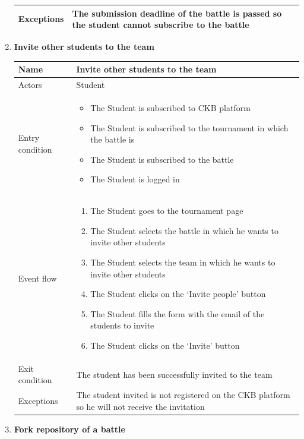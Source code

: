 \begin{enumerate}[label=UC\arabic*:]
\begin{tabular}{|p{3cm}|p{8cm}|}
        \hline
        Exceptions & The submission deadline of the battle is passed so the student cannot subscribe to the battle \\
        \hline
    \end{tabular}
    \item \textbf{Invite other students to the team} \\
    \begin{tabular}{|p{3cm}|p{8cm}|}
        \hline
        Name & Invite other students to the team \\
        \hline
        Actors & Student \\
        \hline
        Entry condition &
        \begin{itemize}
            \item The Student is subscribed to CKB platform
            \item The Student is subscribed to the tournament in which the battle is
            \item The Student is subscribed to the battle
            \item The Student is logged in
        \end{itemize} \\
        \hline
        Event flow &
        \begin{enumerate}[label=\arabic*.]
            \item The Student goes to the tournament page
            \item The Student selects the battle in which he wants to invite other students
            \item The Student selects the team in which he wants to invite other students
            \item The Student clicks on the `Invite people' button
            \item The Student fills the form with the email of the students to invite
            \item The Student clicks on the `Invite' button
        \end{enumerate} \\
        \hline
        Exit condition & The student has been successfully invited to the team \\
        \hline
        Exceptions & The student invited is not registered on the CKB platform so he will not receive the invitation \\
        \hline
    \end{tabular}
    \item \textbf{Fork repository of a battle} \\

\end{enumerate}
